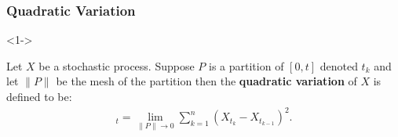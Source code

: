 \documentclass[10pt]{beamer}
\begin{document}
\begin{frame}[t]
  \frametitle{Quadratic Variation}
  \begin{onlyenv}<1->
    \begin{definition}
      Let $X$ be a stochastic process. Suppose $P$ is a partition of $[0,t]$ denoted $t_k$ and let $\lVert P \rVert$ be the mesh of the partition then the \textbf{quadratic variation} of $X$ is defined to be:
      \begin{align*}
        [X]_t = \lim\limits_{\lVert P \rVert \to 0} \displaystyle\sum_{k = 1}^{n}(X_{t_k} - X_{t_{k-1}})^2.
      \end{align*}
    \end{definition}
  \end{onlyenv}
\end{frame}
\end{document}
